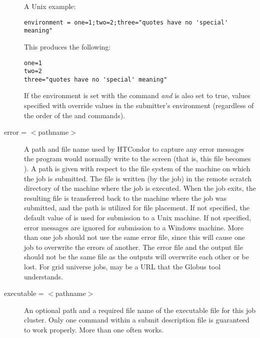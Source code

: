 \begin{description}
A Unix example:

\begin{verbatim}
environment = one=1;two=2;three="quotes have no 'special' meaning"
\end{verbatim}

This produces the following:

\begin{verbatim}
one=1
two=2
three="quotes have no 'special' meaning"
\end{verbatim}

If the environment is set with the  command \emph{and}
 is also set to true, values specified with
 override values in the submitter's environment
(regardless of the order of the  and 
commands).



\label{man-condor-submit-error}
\item[error = $<$pathname$>$]
A path and file name used by HTCondor to capture any
error messages the program would normally write to the screen
(that is, this file becomes ).
A path is given with respect to the file system of the machine
on which the job is submitted.
The file is written (by the job)
in the remote scratch directory of the machine where the job is executed. 
When the job exits, the resulting file is transferred back to the machine
where the job was submitted, and the path is utilized for file placement.
If not specified, the default value of
 is used for submission to a Unix machine.
If not specified, error messages are ignored
for submission to a Windows machine.
More than one job should not use the same error file, since
this will cause one job to overwrite the errors of another.
The error file and the output file should not be the same file
as the outputs will overwrite each other or be lost.
For grid universe jobs,  may be a URL that the Globus
tool  understands.



\label{man-condor-submit-executable}
\item[executable = $<$pathname$>$]
An optional path and a required file name of the executable file for this
job cluster. Only one  command within a
submit description file is guaranteed to work properly.
More than one often works.


\end{description}
